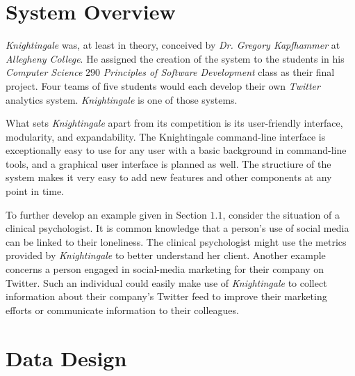 \documentclass[a4paper, 12pt]{article}
\begin{document}
\section{System Overview} \label{sec:overview}
\begin{adjustwidth}{1em}{0pt}
\textit{Knightingale} was, at least in theory, conceived by \textit{Dr. Gregory Kapfhammer} at \textit{Allegheny College}. He assigned the creation of the system to the students in his \textit{Computer Science} $290$ \textit{Principles of Software Development} class as their final project. Four teams of five students would each develop their own \textit{Twitter} analytics system. \textit{Knightingale} is one of those systems. \newline

\noindent What sets \textit{Knightingale} apart from its competition is its user-friendly interface, modularity, and expandability. The Knightingale command-line interface is exceptionally easy to use for any user with a basic background in command-line tools, and a  graphical user interface is planned as well. The structiure of the system makes it very easy to add new features and other components at any point in time. \newline

\noindent To further develop an example given in Section $1.1$, consider the situation of a clinical psychologist. It is common knowledge that a person's use of social media can be linked to their loneliness. The clinical psychologist might use the metrics provided by \textit{Knightingale} to better understand her client. Another example concerns a person engaged in social-media marketing for their company on Twitter. Such an individual could easily make use of \textit{Knightingale} to collect information about their company's Twitter feed to improve their marketing efforts or communicate information to their colleagues.
\end{adjustwidth}
 
\section{Data Design} \label{sec:datadesign}
\end{document}
